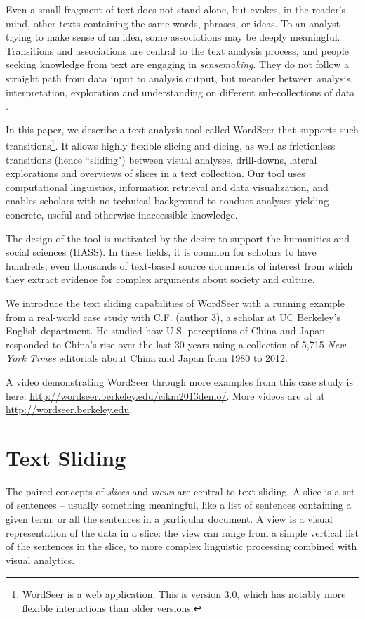 \documentclass{sig-alternate}
\begin{document}
Even a small fragment of text does not stand alone, but evokes, in the reader's mind, other texts containing the same words, phrases, or ideas. To an analyst trying to make sense of an idea, some associations may be deeply meaningful.  Transitions  and associations are central to the text analysis process, and people seeking knowledge from text are engaging in \emph{sensemaking}. They do not follow a straight path from data input to analysis output, but meander between analysis, interpretation, exploration and understanding on different sub-collections of data \cite{pirolli_sensemaking_2005}. 

In this paper, we describe a text analysis tool called WordSeer that supports such transitions\footnote{WordSeer is a web application. This is version 3.0, which has notably more flexible interactions than older versions.}.  It allows highly flexible slicing and dicing, as well as frictionless transitions (hence ``sliding") between visual analyses, drill-downs, lateral explorations and overviews of slices in a text collection. Our tool uses computational linguistics, information retrieval and data visualization, and enables scholars with no technical background to conduct analyses yielding concrete, useful and otherwise inaccessible knowledge. 

The design of the tool is motivated by the desire to support the humanities and social sciences (HASS). In these fields, it is common for scholars to have hundreds, even thousands of text-based source documents of interest from which they extract evidence for complex arguments about society and culture. 

We introduce the text sliding capabilities of WordSeer with a running example from a real-world case study with C.F. (author 3),  a scholar at UC Berkeley's English department. He studied how U.S. perceptions of China and Japan responded to China's rise over the last 30 years using a collection of 5,715  \emph{New York Times} editorials about China and Japan from 1980 to 2012. 

A video demonstrating WordSeer through more examples from  this case study is here: \url{http://wordseer.berkeley.edu/cikm2013demo/}. More videos are at at \url{http://wordseer.berkeley.edu}.

\section{Text Sliding}

The paired concepts of \emph{slices} and \emph{views} are central to text sliding. A slice is a set of sentences -- usually something meaningful, like a list of sentences containing a given term, or all the sentences in a particular document.  A view is a visual representation of the data in a slice: the view can range from a simple vertical list of the sentences in the slice, to more complex linguistic processing combined with visual analytics.
\end{document}
